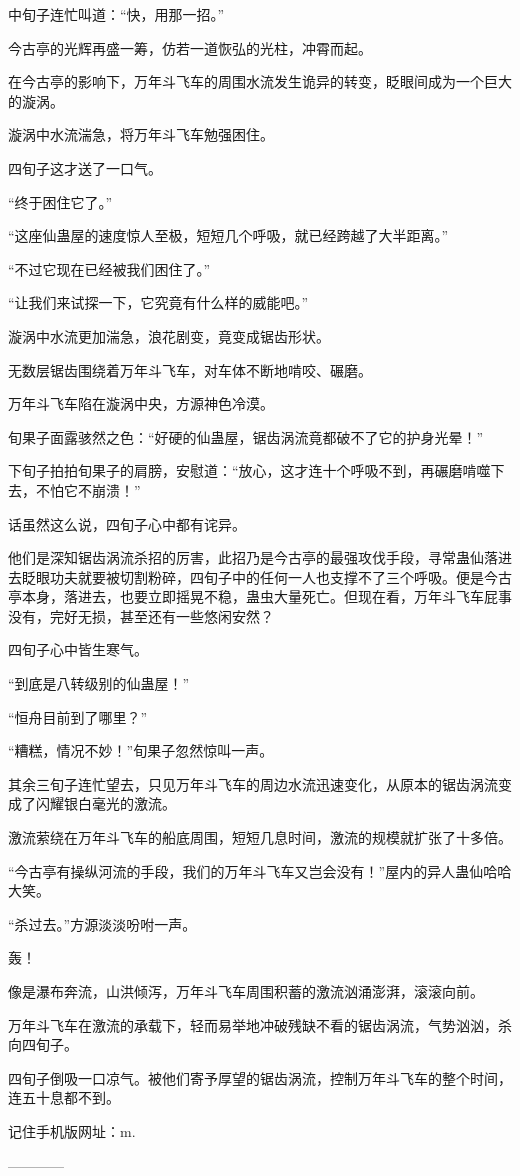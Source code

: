 \begin{this_body}
中旬子连忙叫道：“快，用那一招。”

今古亭的光辉再盛一筹，仿若一道恢弘的光柱，冲霄而起。

在今古亭的影响下，万年斗飞车的周围水流发生诡异的转变，眨眼间成为一个巨大的漩涡。

漩涡中水流湍急，将万年斗飞车勉强困住。

四旬子这才送了一口气。

“终于困住它了。”

“这座仙蛊屋的速度惊人至极，短短几个呼吸，就已经跨越了大半距离。”

“不过它现在已经被我们困住了。”

“让我们来试探一下，它究竟有什么样的威能吧。”

漩涡中水流更加湍急，浪花剧变，竟变成锯齿形状。

无数层锯齿围绕着万年斗飞车，对车体不断地啃咬、碾磨。

万年斗飞车陷在漩涡中央，方源神色冷漠。

旬果子面露骇然之色：“好硬的仙蛊屋，锯齿涡流竟都破不了它的护身光晕！”

下旬子拍拍旬果子的肩膀，安慰道：“放心，这才连十个呼吸不到，再碾磨啃噬下去，不怕它不崩溃！”

话虽然这么说，四旬子心中都有诧异。

他们是深知锯齿涡流杀招的厉害，此招乃是今古亭的最强攻伐手段，寻常蛊仙落进去眨眼功夫就要被切割粉碎，四旬子中的任何一人也支撑不了三个呼吸。便是今古亭本身，落进去，也要立即摇晃不稳，蛊虫大量死亡。但现在看，万年斗飞车屁事没有，完好无损，甚至还有一些悠闲安然？

四旬子心中皆生寒气。

“到底是八转级别的仙蛊屋！”

“恒舟目前到了哪里？”

“糟糕，情况不妙！”旬果子忽然惊叫一声。

其余三旬子连忙望去，只见万年斗飞车的周边水流迅速变化，从原本的锯齿涡流变成了闪耀银白毫光的激流。

激流萦绕在万年斗飞车的船底周围，短短几息时间，激流的规模就扩张了十多倍。

“今古亭有操纵河流的手段，我们的万年斗飞车又岂会没有！”屋内的异人蛊仙哈哈大笑。

“杀过去。”方源淡淡吩咐一声。

轰！

像是瀑布奔流，山洪倾泻，万年斗飞车周围积蓄的激流汹涌澎湃，滚滚向前。

万年斗飞车在激流的承载下，轻而易举地冲破残缺不看的锯齿涡流，气势汹汹，杀向四旬子。

四旬子倒吸一口凉气。被他们寄予厚望的锯齿涡流，控制万年斗飞车的整个时间，连五十息都不到。

记住手机版网址：m.

------------

\end{this_body}

